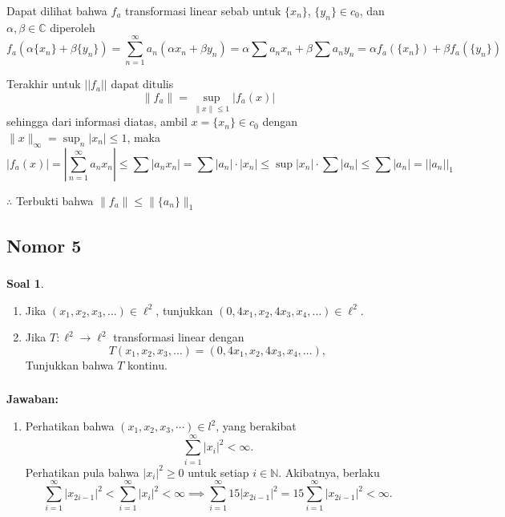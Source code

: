 \documentclass[aspectratio=169]{beamer}
\theoremstyle{definition}
\newtheorem{soal}{Soal}
\newcommand{\N}{\mathbb{N}}
\begin{document}
\begin{frame}
  \frametitle{\insertsection}
  \framesubtitle{\insertsubsection}
  Dapat dilihat bahwa $f_a$ transformasi linear sebab untuk $\{x_n\}$, $\{y_n\} \in c_0$, dan $\alpha, \beta \in \mathbb{C}$ diperoleh
  $$
    f_a(\alpha \{x_n\} + \beta \{y_n\}) = \sum_{n=1}^\infty a_n (\alpha x_n + \beta y_n) = \alpha \sum a_n x_n + \beta \sum a_n y_n = \alpha f_a(\{x_n\}) + \beta f_a(\{y_n\})
  $$

  Terakhir untuk $||f_a||$ dapat ditulis
  $$
    \|f_a\| = \sup_{\|x\| \leq 1} |f_a(x)|
  $$
  sehingga dari informasi diatas, ambil $x = \{x_n\} \in c_0$ dengan $\|x\|_\infty = \sup_n |x_n| \leq 1$, maka
  $$
    |f_a(x)| = \left| \sum_{n=1}^\infty a_n x_n \right| \leq \sum |a_n x_n| = \sum |a_n| \cdot |x_n| \leq \sup |x_n| \cdot \sum |a_n| \leq \sum |a_n| = ||a_n||_1
  $$

  $\therefore$ Terbukti bahwa $\|f_a\| \leq \|\{a_n\}\|_1
  $
\end{frame}

\subsection{Nomor 5}
\begin{frame}
  \frametitle{\insertsection}
  \begin{soal}
    \begin{enumerate}
      \item Jika $(x_1, x_2, x_3, \ldots) \in \ell^2$, tunjukkan $(0, 4x_1, x_2, 4x_3, x_4, \ldots) \in \ell^2$.
      \item Jika $T \colon \ell^2 \to \ell^2$ transformasi linear dengan
            \[
              T(x_1, x_2, x_3, \ldots) = (0, 4x_1, x_2, 4x_3, x_4, \ldots),
            \]
            Tunjukkan bahwa $T$ kontinu.
    \end{enumerate}
  \end{soal}
\end{frame}

\begin{frame}
  \frametitle{\insertsection}
  \framesubtitle{\insertsubsection}
  \textbf{Jawaban:}
  \begin{enumerate}
    \item Perhatikan bahwa $(x_1,x_2,x_3,\cdots)\in l^2$, yang berakibat
          \begin{equation*}
            \sum_{i=1}^\infty|x_i|^2<\infty.
          \end{equation*}
          Perhatikan pula bahwa $|x_i|^2\geq0$ untuk setiap $i\in\N$. Akibatnya, berlaku
          \begin{equation*}
            \sum_{i=1}^\infty|x_{2i-1}|^2<\sum_{i=1}^\infty|x_i|^2<\infty\implies\sum_{i=1}^\infty15|x_{2i-1}|^2=15\sum_{i=1}^\infty|x_{2i-1}|^2<\infty.
          \end{equation*}
  \end{enumerate}
\end{frame}
\end{document}
